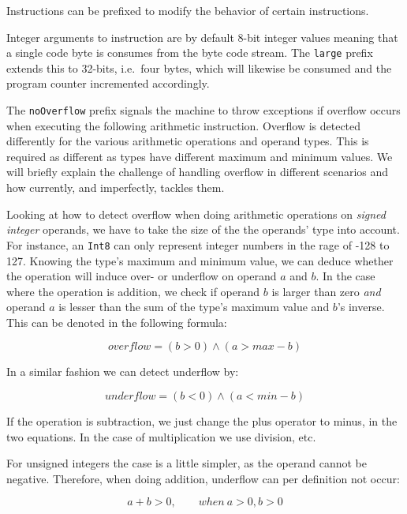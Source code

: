 Instructions can be prefixed to modify the behavior of certain instructions.

Integer arguments to instruction are by default 8-bit integer values meaning
that a single code byte is consumes from the byte code stream. The {\tt large}
prefix extends this to 32-bits, i.e.~four bytes, which will likewise be consumed
and the program counter incremented accordingly.

The {\tt noOverflow} prefix signals the machine to throw exceptions if overflow
occurs when executing the following arithmetic instruction. Overflow is detected
differently for the various arithmetic operations and operand types. This is
required as different as types have different maximum and minimum values. We
will briefly explain the challenge of handling overflow in different scenarios
and how \thename{} currently, and imperfectly, tackles them.

Looking at how to detect overflow when doing arithmetic operations on {\em
  signed integer} operands, we have to take the size of the the operands' type
into account. For instance, an {\tt Int8} can only represent integer numbers in
the rage of -128 to 127. Knowing the type's maximum and minimum value, we can
deduce whether the operation will induce over- or underflow on operand $a$ and
$b$. In the case where the operation is addition, we check if operand $b$ is
larger than zero {\em and} operand $a$ is lesser than the sum of the type's
maximum value and $b$'s inverse. This can be denoted in the following formula:

\label{eq:overflow}
\begin{equation}
  overflow = (b > 0) \wedge (a > max - b)
\end{equation}

In a similar fashion we can detect underflow by:

\begin{equation}
  underflow = (b < 0) \wedge (a < min - b)
\end{equation}

If the operation is subtraction, we just change the plus operator to minus, in
the two equations. In the case of multiplication we use division, etc.

For unsigned integers the case is a little simpler, as the operand cannot be
negative. Therefore, when doing addition, underflow can per definition not
occur:

\begin{equation}
  a + b > 0, \qquad when\ a > 0, b > 0
\end{equation}

